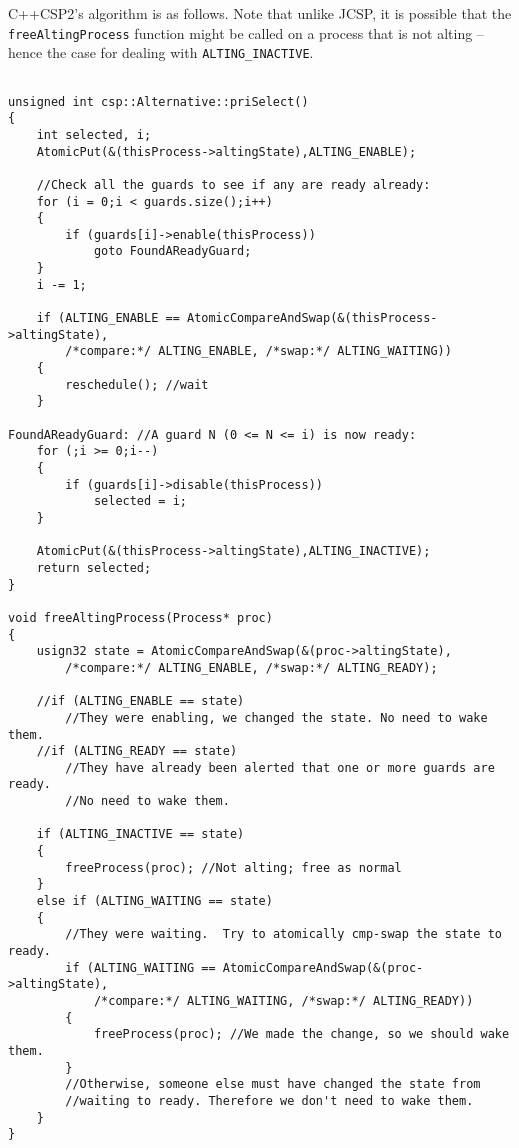 \documentclass[12pt]{IOS-Book-Article-CPA-2007}
\begin{document}
C++CSP2's algorithm is as follows.  Note that unlike JCSP, it is possible that the \verb$freeAltingProcess$ function might be called on a process that
is not alting -- hence the case for dealing with \verb$ALTING_INACTIVE$.

\newpage

{\small\begin{verbatim}

unsigned int csp::Alternative::priSelect()
{
    int selected, i;
    AtomicPut(&(thisProcess->altingState),ALTING_ENABLE);

    //Check all the guards to see if any are ready already:
    for (i = 0;i < guards.size();i++)
    {        
        if (guards[i]->enable(thisProcess))
            goto FoundAReadyGuard;
    }    
    i -= 1;

    if (ALTING_ENABLE == AtomicCompareAndSwap(&(thisProcess->altingState),
        /*compare:*/ ALTING_ENABLE, /*swap:*/ ALTING_WAITING))
    {
        reschedule(); //wait
    }

FoundAReadyGuard: //A guard N (0 <= N <= i) is now ready: 
    for (;i >= 0;i--)
    {        
        if (guards[i]->disable(thisProcess))
            selected = i;
    }
    
    AtomicPut(&(thisProcess->altingState),ALTING_INACTIVE);
    return selected;
}

void freeAltingProcess(Process* proc)
{
    usign32 state = AtomicCompareAndSwap(&(proc->altingState),
        /*compare:*/ ALTING_ENABLE, /*swap:*/ ALTING_READY);
            
    //if (ALTING_ENABLE == state)
        //They were enabling, we changed the state. No need to wake them.
    //if (ALTING_READY == state)
        //They have already been alerted that one or more guards are ready.  
        //No need to wake them.        
        
    if (ALTING_INACTIVE == state)                
    {
        freeProcess(proc); //Not alting; free as normal
    }
    else if (ALTING_WAITING == state)
    {
        //They were waiting.  Try to atomically cmp-swap the state to ready.
        if (ALTING_WAITING == AtomicCompareAndSwap(&(proc->altingState),
            /*compare:*/ ALTING_WAITING, /*swap:*/ ALTING_READY))
        {            
            freeProcess(proc); //We made the change, so we should wake them.
        }
        //Otherwise, someone else must have changed the state from 
        //waiting to ready. Therefore we don't need to wake them.
    }
}
\end{verbatim}}
\end{document}
